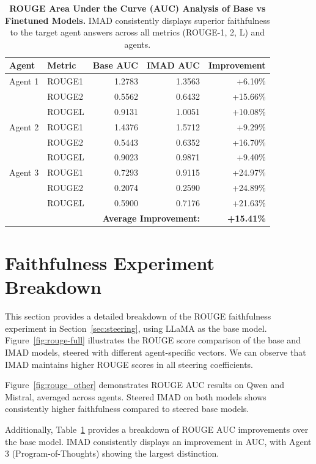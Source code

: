 \begin{table}[h]
\centering
\caption{\textbf{ROUGE Area Under the Curve (AUC) Analysis of Base vs Finetuned Models.} IMAD consistently displays superior faithfulness to the target agent answers across all metrics (ROUGE-1, 2, L) and agents.}
\label{tab:rouge-full}
\begin{tabular}{llrrr}
\hline
\textbf{Agent} & \textbf{Metric} & \textbf{Base AUC} & \textbf{IMAD AUC} & \textbf{Improvement} \\
\hline
Agent 1 & ROUGE1 & 1.2783 & 1.3563 & +6.10\% \\
 & ROUGE2 & 0.5562 & 0.6432 & +15.66\% \\
 & ROUGEL & 0.9131 & 1.0051 & +10.08\% \\
\hline
Agent 2 & ROUGE1 & 1.4376 & 1.5712 & +9.29\% \\
 & ROUGE2 & 0.5443 & 0.6352 & +16.70\% \\
 & ROUGEL & 0.9023 & 0.9871 & +9.40\% \\
\hline
Agent 3 & ROUGE1 & 0.7293 & 0.9115 & +24.97\% \\
 & ROUGE2 & 0.2074 & 0.2590 & +24.89\% \\
 & ROUGEL & 0.5900 & 0.7176 & +21.63\% \\
\hline
\multicolumn{4}{r}{\textbf{Average Improvement:}} & \textbf{+15.41\%} \\
\hline
\end{tabular}
\end{table}

\section{Faithfulness Experiment Breakdown}\label{app:rouge_breakdown}
This section provides a detailed breakdown of the ROUGE faithfulness experiment in Section~\ref{sec:steering}, using LLaMA as the base model. Figure~\ref{fig:rouge-full} illustrates the ROUGE score comparison of the base and IMAD models, steered with different agent-specific vectors. 
We can observe that IMAD maintains higher ROUGE scores in all steering coefficients. 

Figure~\ref{fig:rouge_other} demonstrates ROUGE AUC results on Qwen and Mistral, averaged across agents. Steered IMAD on both models shows consistently higher faithfulness compared to steered base models. 

Additionally, Table~\ref{tab:rouge-full} provides a breakdown of ROUGE AUC improvements over the base model. IMAD consistently displays an improvement in AUC, with Agent 3 (Program-of-Thoughts) showing the largest distinction. 

